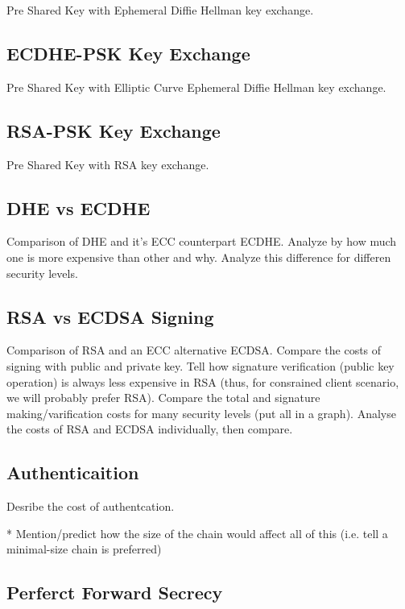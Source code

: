 \documentclass{llncs}
\begin{document}
Pre Shared Key with Ephemeral Diffie Hellman key exchange.

\subsection{ECDHE-PSK Key Exchange}

Pre Shared Key with Elliptic Curve Ephemeral Diffie Hellman key exchange.

\subsection{RSA-PSK Key Exchange}

Pre Shared Key with RSA key exchange.


\subsection{DHE vs ECDHE}

Comparison of DHE and it's ECC counterpart ECDHE. Analyze by how much one is more expensive than other and why.
Analyze this difference for differen security levels.

\subsection{RSA vs ECDSA Signing}

Comparison of RSA and an ECC alternative ECDSA. Compare the costs of signing with public and private key.
Tell how signature verification (public key operation) is always less expensive in RSA (thus, for consrained client
scenario, we will probably prefer RSA). Compare the total and signature making/varification costs for many security
levels (put all in a graph). Analyse the costs of RSA and ECDSA individually, then compare.

\subsection{Authenticaition}

Desribe the cost of authentcation.

* Mention/predict how the size of the chain would affect all of this (i.e. tell a minimal-size chain is
preferred)

\subsection{Perferct Forward Secrecy}
\end{document}
